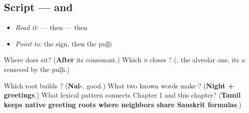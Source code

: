 \subsection*{Script —  and }
\begin{itemize}
\raggedright
  \item \emph{Read it:} \textbf{} — then \textbf{} — then \textbf{}
  \item \emph{Point to:} the  sign, then the puḷḷi
\end{itemize}

Where does \textbf{} sit? (\textbf{After} its consonant.) Which \emph{n} closes \textbf{}? (\textbf{}, the alveolar one, its \emph{a} removed by the puḷḷi.)

\begin{tcolorbox}[breakable,colback=teal!4,colframe=teal!35!black,title={Before you move on}]
Which root builds \textbf{}? (\textbf{Nal-}, good.) What two known words make \textbf{ }? (\textbf{Night + greetings}.) What lexical pattern connects Chapter 1 and this chapter? (\textbf{Tamil keeps native greeting roots where neighbors share Sanskrit formulas}.)
\end{tcolorbox}
